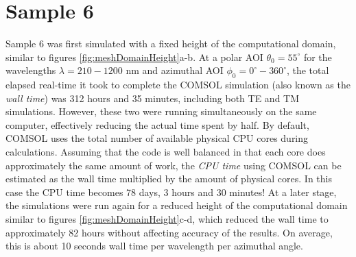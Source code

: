 \section{Sample 6}
Sample 6 was first simulated with a fixed height of the computational domain, similar to figures \ref{fig:meshDomainHeight}a-b. At a polar AOI $\theta_0=55^\circ$ for the wavelengths $\lambda=210-1200$ nm and azimuthal AOI $\phi_0=0^\circ-360^\circ$, the total elapsed real-time it took to complete the COMSOL simulation (also known as the \emph{wall time}) was 312 hours and 35 minutes, including both TE and TM simulations. However, these two were running simultaneously on the same computer, effectively reducing the actual time spent by half. By default, COMSOL uses the total number of available physical CPU cores during calculations. Assuming that the code is well balanced in that each core does approximately the same amount of work, the \emph{CPU time} using COMSOL can be estimated as the wall time multiplied by the amount of physical cores. In this case the CPU time becomes 78 days, 3 hours and 30 minutes! At a later stage, the simulations were run again for a reduced height of the computational domain similar to figures \ref{fig:meshDomainHeight}c-d, which reduced the wall time to approximately 82 hours without affecting accuracy of the results. On average, this is about 10 seconds wall time per wavelength per azimuthal angle.

